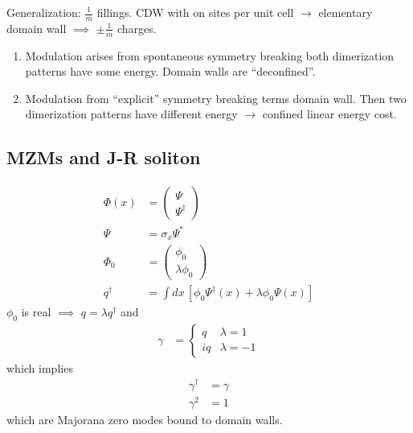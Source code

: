 Generalization: $\frac{1}{m}$ fillings.
CDW with on sites per unit cell $\to$
elementary domain wall
$\implies$
$\pm \frac{1}{m}$ charges.

\begin{enumerate}
    \item Modulation arises from spontaneous symmetry breaking
        both dimerization patterns have some energy.
        Domain walls are ``deconfined''.
    \item Modulation from ``explicit'' symmetry breaking terms domain wall.
        Then two dimerization patterns have different energy
        $\to$ confined linear energy cost.
\end{enumerate}

\subsection{MZMs and J-R soliton}
\begin{align}
    \Phi(x) &=
    \begin{pmatrix}
        \Psi\\
        \Psi^\dagger
    \end{pmatrix}\\
    \Psi &= \sigma_x \Psi^*\\
    \Phi_0 &=
    \begin{pmatrix}
        \phi_0\\
        \lambda \phi_0
    \end{pmatrix}\\
    q^\dagger &=
    \int dx\, \left[
    \phi_0\Psi^\dagger(x) + \lambda \phi_0\Psi(x)
    \right]
\end{align}
$\phi_0$ is real $\implies$ $q= \lambda q^\dagger$ and
\begin{align}
    \gamma &=
    \begin{cases}
        q & \lambda = 1\\
        iq & \lambda = -1
    \end{cases}
\end{align}
which implies
\begin{align}
    \gamma^\dagger &= \gamma\\
    \gamma^2 &= 1
\end{align}
which are Majorana zero modes bound to domain walls.
